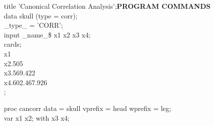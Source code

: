 \begin{mvbox}
{\ttfamily\small
title 'Canonical Correlation Analysis';\hfill\textbf{\rmfamily PROGRAM COMMANDS}\\
data skull (type = corr);\\
\_type\_ = 'CORR';\\
input \_name\_\$ x1 x2 x3 x4;\\
cards;\\
x1\\
x2\quad .505\\
x3\quad .569\quad .422\\
x4\quad .602\quad .467\quad .926\\
;\\
\par\vspace{8pt}
proc cancorr data = skull vprefix = head wprefix = leg;\\
\hspace*{2em}var x1 x2; with x3 x4;
\par}
\end{mvbox}
